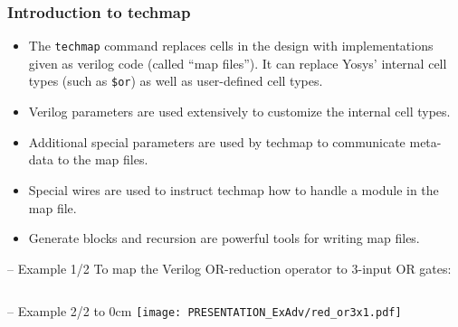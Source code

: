 \begin{frame}
\subsectionpage
\subsectionpagesuffix
\end{frame}

\subsubsection{Introduction to techmap}

\begin{frame}{\subsubsecname}
\begin{itemize}
\item
The {\tt techmap} command replaces cells in the design with implementations given
as verilog code (called ``map files''). It can replace Yosys' internal cell
types (such as {\tt \$or}) as well as user-defined cell types.
\medskip\item
Verilog parameters are used extensively to customize the internal cell types.
\medskip\item
Additional special parameters are used by techmap to communicate meta-data to the
map files.
\medskip\item
Special wires are used to instruct techmap how to handle a module in the map file.
\medskip\item
Generate blocks and recursion are powerful tools for writing map files.
\end{itemize}
\end{frame}

\begin{frame}[t]{\subsubsecname -- Example 1/2}
\vskip-0.2cm
To map the Verilog OR-reduction operator to 3-input OR gates:
\vskip-0.2cm
\begin{columns}


\end{columns}
\end{frame}

\begin{frame}[t]{\subsubsecname -- Example 2/2}
\vbox to 0cm{
\hfil\texttt{[image: PRESENTATION\_ExAdv/red\_or3x1.pdf]}
\vss
}
\begin{columns}
\column[t]{6cm}
\column[t]{4cm}
\vskip-0.6cm
\vskip-0.2cm
\end{columns}
\end{frame}

